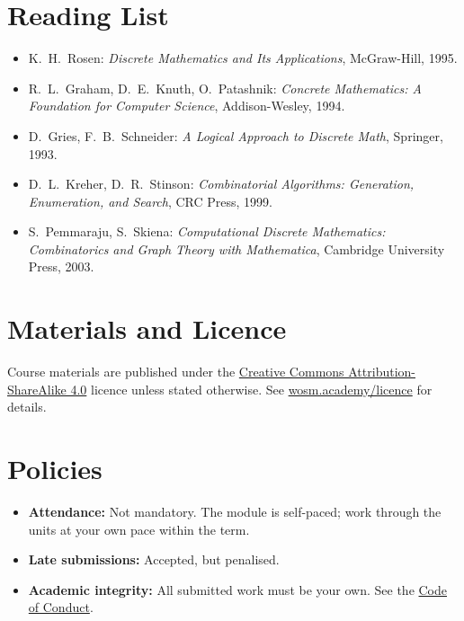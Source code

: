 \documentclass[11pt,a4paper]{article}
\begin{document}
\section{Reading List}
\begin{itemize}
  \item K.\ H.\ Rosen: \textit{Discrete Mathematics and Its Applications},
        McGraw-Hill, 1995.
  \item R.\ L.\ Graham, D.\ E.\ Knuth, O.\ Patashnik: \textit{Concrete Mathematics:
        A Foundation for Computer Science}, Addison-Wesley, 1994.
  \item D.\ Gries, F.\ B.\ Schneider: \textit{A Logical Approach to Discrete Math},
        Springer, 1993.
  \item D.\ L.\ Kreher, D.\ R.\ Stinson: \textit{Combinatorial Algorithms:
        Generation, Enumeration, and Search}, CRC Press, 1999.
  \item S.\ Pemmaraju, S.\ Skiena: \textit{Computational Discrete Mathematics:
        Combinatorics and Graph Theory with Mathematica}, Cambridge University
        Press, 2003.
\end{itemize}

\section{Materials and Licence}
Course materials are published under the
\href{https://creativecommons.org/licenses/by-sa/4.0/}{Creative Commons Attribution-ShareAlike 4.0}
licence unless stated otherwise. See \href{https://wosm.academy/licence/}{wosm.academy/licence} for details.

\section{Policies}
\begin{itemize}
  \item \textbf{Attendance:} Not mandatory. The module is self-paced; work through the units at your own pace within the term.
  \item \textbf{Late submissions:} Accepted, but penalised.
  \item \textbf{Academic integrity:} All submitted work must be your own.
        See the \href{https://wosm.academy/code-of-conduct/}{Code of Conduct}.
\end{itemize}
\end{document}
